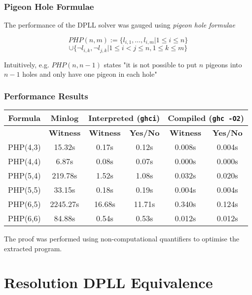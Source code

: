 \documentclass{beamer}
\begin{document}
\begin{frame}
\frametitle{Pigeon Hole Formulae}
The performance of the DPLL solver was gauged using \emph{pigeon hole formulae}
\medskip


$$PHP(n,m) := \{l_{i,1} , \ldots , l_{i,m} | 1 \leq i \leq n  \} $$
 $$ \cup \{ \neg l_{i,k} , \neg l_{j,k} | 1 \leq i < j \leq n, 1 \leq k \leq m \}  $$

\medskip 

Intuitively, e.g. $PHP(n,n-1)$ states "it is not possible to put $n$ pigeons into $n-1$ holes and only have one pigeon in each hole"

\end{frame}

\begin{frame}
\frametitle{Performance Results}


\begin{tabular}{|c|c|c|c|c|c|}
  \hline
  \textbf{Formula}  & \textbf{Minlog} &  \multicolumn{2}{|c|}{\textbf{Interpreted (\texttt{ghci})}} & \multicolumn{2}{|c|}{\textbf{Compiled (\texttt{ghc -O2})}}  \\ \hline
  & \textbf{Witness} & \textbf{Witness} & \textbf{Yes/No} & \textbf{Witness} & \textbf{Yes/No} \\ \hline
  PHP(4,3) & 15.32s   &  0.17s   &  0.12s  &  0.008s  &  0.004s \\ \hline
  PHP(4,4) & 6.87s    &  0.08s   &  0.07s  &  0.000s  &  0.000s \\ \hline
  PHP(5,4) & 219.78s  &  1.52s   &  1.08s  &  0.032s  &  0.020s \\ \hline
  PHP(5,5) & 33.15s   &  0.18s   &  0.19s  &  0.004s  &  0.004s \\ \hline
  PHP(6,5) & 2245.27s &  16.68s  &  11.71s &  0.340s  &  0.124s \\ \hline
  PHP(6,6) & 84.88s   &  0.54s   &  0.53s  &  0.012s  &  0.012s \\ \hline
\end{tabular}

\bigskip

The proof was performed using \alert{non-computational} quantifiers to optimise the extracted program.

\end{frame}


\section{Resolution DPLL Equivalence}
\end{document}
